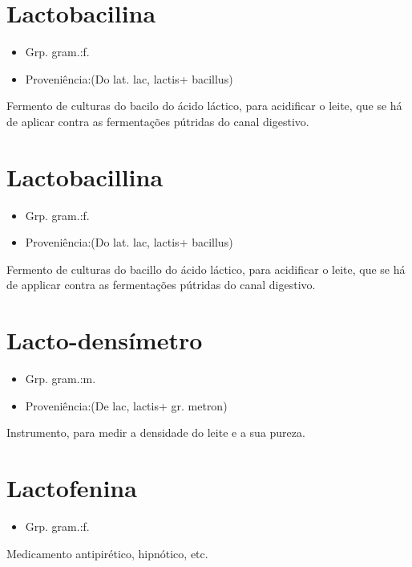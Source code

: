 \section{Lactobacilina}
\begin{itemize}
\item {Grp. gram.:f.}
\end{itemize}
\begin{itemize}
\item {Proveniência:(Do lat. \textunderscore lac\textunderscore , \textunderscore lactis\textunderscore  + \textunderscore bacillus\textunderscore )}
\end{itemize}
Fermento de culturas do bacilo do ácido láctico, para acidificar o leite, que se há de aplicar contra as fermentações pútridas do canal digestivo.
\section{Lactobacillina}
\begin{itemize}
\item {Grp. gram.:f.}
\end{itemize}
\begin{itemize}
\item {Proveniência:(Do lat. \textunderscore lac\textunderscore , \textunderscore lactis\textunderscore  + \textunderscore bacillus\textunderscore )}
\end{itemize}
Fermento de culturas do bacillo do ácido láctico, para acidificar o leite, que se há de applicar contra as fermentações pútridas do canal digestivo.
\section{Lacto-densímetro}
\begin{itemize}
\item {Grp. gram.:m.}
\end{itemize}
\begin{itemize}
\item {Proveniência:(De \textunderscore lac\textunderscore , \textunderscore lactis\textunderscore  + gr. \textunderscore metron\textunderscore )}
\end{itemize}
Instrumento, para medir a densidade do leite e a sua pureza.
\section{Lactofenina}
\begin{itemize}
\item {Grp. gram.:f.}
\end{itemize}
Medicamento antipirético, hipnótico, etc.
